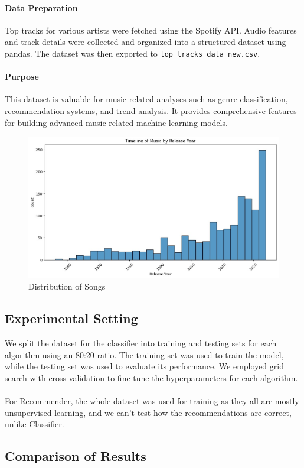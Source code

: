 \documentclass[a4paper, 24pt]{article}
\begin{document}
\paragraph{Data Preparation}

Top tracks for various artists were fetched using the Spotify API. Audio features and track details were collected and organized into a structured dataset using pandas. The dataset was then exported to \texttt{top\_tracks\_data\_new.csv}.
\paragraph{Purpose}
This dataset is valuable for music-related analyses such as genre classification, recommendation systems, and trend analysis. It provides comprehensive features for building advanced music-related machine-learning models.
\begin{figure}[h]
    \centering
    \includegraphics[width=0.5\linewidth]{WhatsApp Image 2024-04-21 at 01.42.27_9751c0c6.jpg}
    \caption{Distribution of Songs}
    \label{fig:Song_Distribution}
\end{figure}
\subsection{Experimental Setting}
We split the dataset for the classifier into training and testing sets for each algorithm using an 80:20 ratio. The training set was used to train the model, while the testing set was used to evaluate its performance. We employed grid search with cross-validation to fine-tune the hyperparameters for each algorithm. \\
\\
For Recommender, the whole dataset was used for training as they all are mostly unsupervised learning, and we can't test how the recommendations are correct, unlike Classifier.
\subsection{Comparison of Results}
\end{document}
